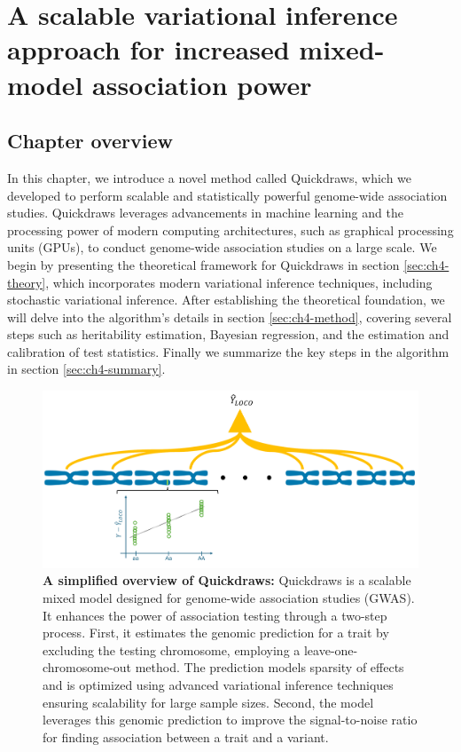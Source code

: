 \chapter{\label{ch:4-qd-method}A scalable variational inference approach for increased mixed-model association power}

\minitoc

\section{Chapter overview}
In this chapter, we introduce a novel method called Quickdraws, which we developed to perform scalable and statistically powerful genome-wide association studies. Quickdraws leverages advancements in machine learning and the processing power of modern computing architectures, such as graphical processing units (GPUs), to conduct genome-wide association studies on a large scale. We begin by presenting the theoretical framework for Quickdraws in section \ref{sec:ch4-theory}, which incorporates modern variational inference techniques, including stochastic variational inference. After establishing the theoretical foundation, we will delve into the algorithm's details in section \ref{sec:ch4-method}, covering several steps such as heritability estimation, Bayesian regression, and the estimation and calibration of test statistics. Finally we summarize the key steps in the algorithm in section \ref{sec:ch4-summary}.

\begin{figure}[h!]
    \centering
    \includegraphics[width=\textwidth]{figures/thesis_qd_simplified_overview.pdf}
    \caption{\textbf{A simplified overview of Quickdraws:} Quickdraws is a scalable mixed model designed for genome-wide association studies (GWAS). It enhances the power of association testing through a two-step process. First, it estimates the genomic prediction for a trait by excluding the testing chromosome, employing a leave-one-chromosome-out method. The prediction models sparsity of effects and is optimized using advanced variational inference techniques ensuring scalability for large sample sizes. Second, the model leverages this genomic prediction to improve the signal-to-noise ratio for finding association between a trait and a variant.}
    \label{fig:qd-simplified-overview}
\end{figure}

